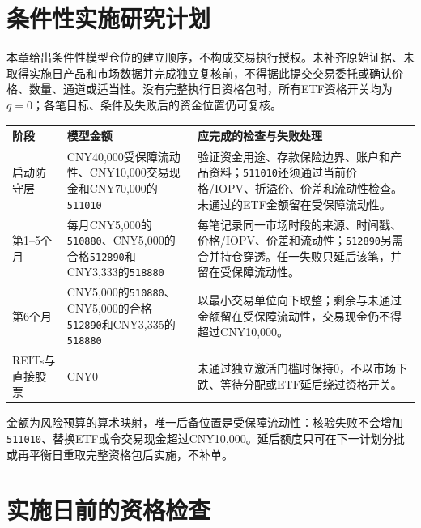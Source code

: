 \section{条件性实施研究计划}

本章给出条件性模型仓位的建立顺序，不构成交易执行授权。未补齐原始证据、未取得实施日产品和市场数据并完成独立复核前，不得据此提交交易委托或确认价格、数量、通道或适当性。没有完整执行日资格包时，所有ETF资格开关均为$q=0$；各笔目标、条件及失败后的资金位置仍可复核。

\begin{exhibitbox}[六个月模型实施动作]
\footnotesize
\begin{tabularx}{\exhibitboxwidth}{L{2.6cm}P P}
\toprule
\textbf{阶段} & \textbf{模型金额} & \textbf{应完成的检查与失败处理} \\
\midrule
启动防守层 & CNY40,000受保障流动性、CNY10,000交易现金和CNY70,000的\texttt{511010} & 验证资金用途、存款保险边界、账户和产品资料；\texttt{511010}还须通过当前价格/IOPV、折溢价、价差和流动性检查。未通过的ETF金额留在受保障流动性。 \\
第1--5个月 & 每月CNY5,000的\texttt{510880}、CNY5,000的合格\texttt{512890}和CNY3,333的\texttt{518880} & 每笔记录同一市场时段的来源、时间戳、价格/IOPV、价差和流动性；\texttt{512890}另需合并持仓穿透。任一失败只延后该笔，并留在受保障流动性。 \\
第6个月 & CNY5,000的\texttt{510880}、CNY5,000的合格\texttt{512890}和CNY3,335的\texttt{518880} & 以最小交易单位向下取整；剩余与未通过金额留在受保障流动性，交易现金仍不得超过CNY10,000。 \\
REITs与直接股票 & CNY0 & 未通过独立激活门槛时保持0，不以市场下跌、等待分配或ETF延后绕过资格开关。 \\
\bottomrule
\end{tabularx}
\end{exhibitbox}

金额为风险预算的算术映射，唯一后备位置是受保障流动性：核验失败不会增加\texttt{511010}、替换ETF或令交易现金超过CNY10,000。延后额度只可在下一计划分批或再平衡日重取完整资格包后实施，不补单。

\section{实施日前的资格检查}

